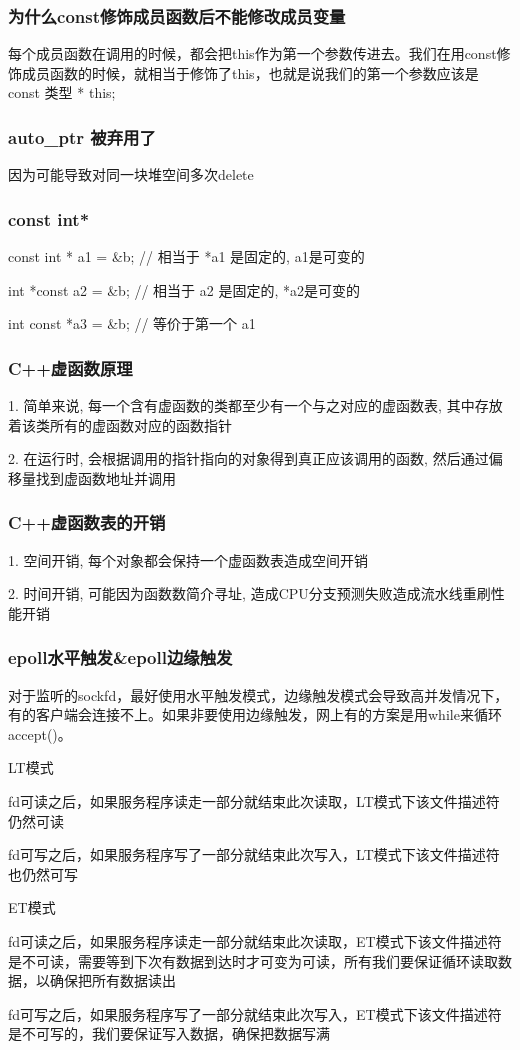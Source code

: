 \documentclass[UTF8]{ctexart}
\begin{document}
\subsubsection{为什么const修饰成员函数后不能修改成员变量}
每个成员函数在调用的时候，都会把this作为第一个参数传进去。我们在用const修饰成员函数的时候，就相当于修饰了this，也就是说我们的第一个参数应该是 const 类型 * this;
\subsubsection{auto\_ptr 被弃用了}
因为可能导致对同一块堆空间多次delete \par
\subsubsection{const int*}
const int * a1 = \&b; // 相当于 *a1 是固定的, a1是可变的 \par
int *const a2 = \&b; // 相当于 a2 是固定的, *a2是可变的 

int const *a3 = \&b; // 等价于第一个 a1
\subsubsection{C++虚函数原理}
1. 简单来说, 每一个含有虚函数的类都至少有一个与之对应的虚函数表, 其中存放着该类所有的虚函数对应的函数指针 \par
2. 在运行时, 会根据调用的指针指向的对象得到真正应该调用的函数, 然后通过偏移量找到虚函数地址并调用 \par
\subsubsection{C++虚函数表的开销}
1. 空间开销, 每个对象都会保持一个虚函数表造成空间开销 \par
2. 时间开销, 可能因为函数数简介寻址, 造成CPU分支预测失败造成流水线重刷性能开销 \par
\subsubsection{epoll水平触发\&epoll边缘触发}
对于监听的sockfd，最好使用水平触发模式，边缘触发模式会导致高并发情况下，有的客户端会连接不上。如果非要使用边缘触发，网上有的方案是用while来循环accept()。 \par
LT模式 \par
fd可读之后，如果服务程序读走一部分就结束此次读取，LT模式下该文件描述符仍然可读\par
fd可写之后，如果服务程序写了一部分就结束此次写入，LT模式下该文件描述符也仍然可写\par
ET模式 \par
fd可读之后，如果服务程序读走一部分就结束此次读取，ET模式下该文件描述符是不可读，需要等到下次有数据到达时才可变为可读，所有我们要保证循环读取数据，以确保把所有数据读出 \par
fd可写之后，如果服务程序写了一部分就结束此次写入，ET模式下该文件描述符是不可写的，我们要保证写入数据，确保把数据写满 \par
\end{document}
